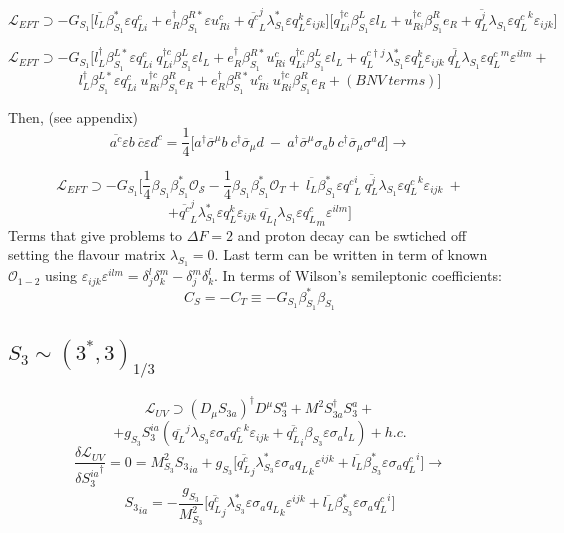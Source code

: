 \documentclass{article}
\begin{document}
\[
\mathcal{L}_{EFT} \supset -G_{S_1} \big[ \overline{l_L} \beta^*_{S_1} \varepsilon q^c_{L i} +  e^\dagger_{R} \beta^{R*}_{S_1} \varepsilon u^c_{R i} + \overline{q^c}_L^j \lambda_{S_1}^* \varepsilon q^k_L \varepsilon_{ijk}\big] \big[ q^{\dagger c}_{L i} \beta^L_{S_1} \varepsilon l_L + u^{\dagger c}_{R i} \beta^R_{S_1}  e_R + \overline{q^j_L} \lambda_{S_1} \varepsilon {q^{c}_L}^k \varepsilon_{ijk} \big]
\]

\[
\mathcal{L}_{EFT} \supset -G_{S_1} \big[ l^\dagger_L \beta^{L*}_{S_1} \varepsilon q^c_{L i} \ q^{\dagger c}_{L i} \beta^L_{S_1} \varepsilon l_L + 
e^\dagger_{R} \beta^{R*}_{S_1} u^c_{R i} \ q^{\dagger c}_{L i} \beta^L_{S_1} \varepsilon l_L + 
q^{c\dagger j}_L \lambda_{S_1}^* \varepsilon q^k_L \varepsilon_{ijk} \ \overline{q^l_L} \lambda_{S_1} \varepsilon {q^{c}_L}^m \varepsilon^{ilm} + 
\]
\[
 l^\dagger_L \beta^{L*}_{S_1} \varepsilon q^c_{L i} \ u^{\dagger c}_{R i} \beta^R_{S_1}  e_R +
e^\dagger_{R } \beta^{R*}_{S_1} u^c_{R i} \ u^{\dagger c}_{R i} \beta^R_{S_1}  e_R+ (BNV \ terms) 
\big] 
\]


Then, (see appendix)
\[
\overline{a^c} \varepsilon b \  \overline{c} \varepsilon d^c =\frac{1}{4}\big[ a^\dagger \overline{\sigma}^ \mu b \ c^\dagger \overline{\sigma}_\mu d \ - \ a^\dagger \overline{\sigma}^\mu  \sigma_a b \ c^\dagger \overline{\sigma}_\mu  \sigma^a d \big] \rightarrow
\]

\[
\mathcal{L}_{EFT} \supset -G_{S_1} \big[ \frac{1}{4} \beta_{S_1} \beta_{S_1}^* \mathcal{O_S} - \frac{1}{4} \beta_{S_1} \beta_{S_1}^* \mathcal{O}_T + \  \overline{l_L} \beta^*_{S_1} \varepsilon {q^c}^i_{L} \ \overline{q^j_L} \lambda_{S_1} \varepsilon {q^{c}_L}^k \varepsilon_{ijk} \ + 
\]
\[
+ \overline{q^c}_L^j \lambda_{S_1}^* \varepsilon q^k_L \varepsilon_{ijk} \ \overline{q_L}_l \lambda_{S_1} \varepsilon {q^c_L}_m \varepsilon^{ilm} \big]
\]
Terms that give problems to $\Delta F=2$ and proton decay can be swtiched off setting the flavour matrix $\lambda_{S_1}=0$. Last term can be written in term of known $\mathcal{O}_{1-2}$ using $\varepsilon_{ijk} \varepsilon^{ilm} = \delta_j^l \delta_k^m -\delta_j^m \delta_k^l $.
In terms of Wilson's semileptonic coefficients:
\[
C_S = - C_T \equiv - G_{S_1} \beta^*_{S_1} \beta_{S_1} 
\]
\subsection{$S_3 \sim (3^*, 3)_{1/3}$}
\[
\mathcal{L}_{UV} \supset (D_\mu S_{3a})^\dagger D^\mu S_3^a + M^2 S_{3a}^\dagger S_3^a +
\]
\[
+g_{S_3} S_3^{ia}(\overline{q_L}^j \lambda_{S_3} \varepsilon \sigma_a {q^c_L}^k \varepsilon_{ijk} + \overline{q_L^c}_i \beta_{S_3} \varepsilon \sigma_a l_L) +h.c.
\]
\[
\frac{\delta \mathcal{L}_{UV}}{\delta {S_{3}^{ia}}^\dagger} =0 = M^2_{S_3} {S_3}_{ia} + g_{S_3} \big[ \overline{q_L^c}_j \lambda^*_{S_3} \varepsilon \sigma_a {q_L}_k \varepsilon^{ijk} + \overline{l_L} \beta_{S_3}^* \varepsilon \sigma_a {q^c_L}^i \big] \rightarrow
\]
\[
{S_3}_{ia} = -\frac{g_{S_3}}{M^2_{S_3}} \big[ \overline{q_L^c}_j \lambda^*_{S_3} \varepsilon \sigma_a {q_L}_k \varepsilon^{ijk} + \overline{l_L} \beta_{S_3}^* \varepsilon \sigma_a {q^c_L}^i \big] 
\]
\end{document}

